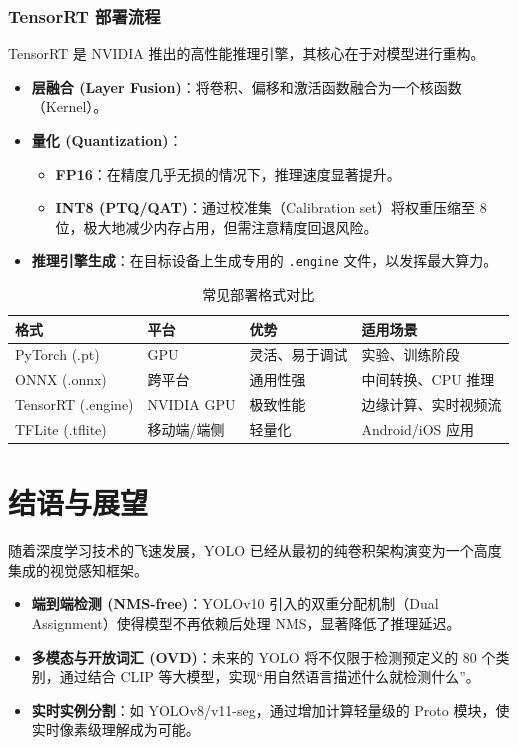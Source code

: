 \documentclass[11pt,a4paper]{article}
\begin{document}
\subsubsection{TensorRT 部署流程}
TensorRT 是 NVIDIA 推出的高性能推理引擎，其核心在于对模型进行重构。
\begin{itemize}
    \item \textbf{层融合 (Layer Fusion)}：将卷积、偏移和激活函数融合为一个核函数（Kernel）。
    \item \textbf{量化 (Quantization)}：
        \begin{itemize}
            \item \textbf{FP16}：在精度几乎无损的情况下，推理速度显著提升。
            \item \textbf{INT8 (PTQ/QAT)}：通过校准集（Calibration set）将权重压缩至 8 位，极大地减少内存占用，但需注意精度回退风险。
    \end{itemize}
    \item \textbf{推理引擎生成}：在目标设备上生成专用的 \texttt{.engine} 文件，以发挥最大算力。
\end{itemize}

\begin{table}[h]
    \centering
    \caption{常见部署格式对比}
    \begin{tabular}{@{}llll@{}}
        \toprule
        \textbf{格式} & \textbf{平台} & \textbf{优势} & \textbf{适用场景} \\ \midrule
        PyTorch (.pt) & GPU & 灵活、易于调试 & 实验、训练阶段 \\
        ONNX (.onnx) & 跨平台 & 通用性强 & 中间转换、CPU 推理 \\
        TensorRT (.engine) & NVIDIA GPU & 极致性能 & 边缘计算、实时视频流 \\
        TFLite (.tflite) & 移动端/端侧 & 轻量化 & Android/iOS 应用 \\ \bottomrule
    \end{tabular}
\end{table}


\section{结语与展望}
随着深度学习技术的飞速发展，YOLO 已经从最初的纯卷积架构演变为一个高度集成的视觉感知框架。
\begin{itemize}
    \item \textbf{端到端检测 (NMS-free)}：YOLOv10 引入的双重分配机制（Dual Assignment）使得模型不再依赖后处理 NMS，显著降低了推理延迟。
    \item \textbf{多模态与开放词汇 (OVD)}：未来的 YOLO 将不仅限于检测预定义的 80 个类别，通过结合 CLIP 等大模型，实现“用自然语言描述什么就检测什么”。
    \item \textbf{实时实例分割}：如 YOLOv8/v11-seg，通过增加计算轻量级的 Proto 模块，使实时像素级理解成为可能。
\end{itemize}
\end{document}
